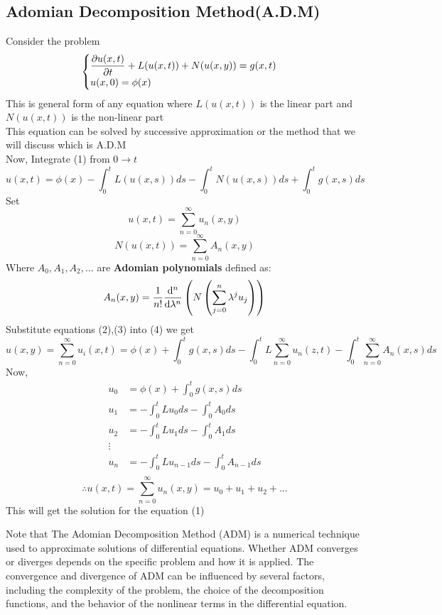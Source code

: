 \subsection {Adomian Decomposition Method(A.D.M)}
Consider the problem
\begin{equation}
    \begin{cases}
        \displaystyle \pdv{u(x,t)}{t} + L(u(x,t)) + N(u(x,y)) = g(x,t)
        \\
        \displaystyle u(x,0) = \phi(x)
    \end{cases}
\end{equation}
This is general form of any equation where $L(u(x,t))$ is the linear part and $N(u(x,t))$ is the non-linear part
\\
This equation can be solved by successive approximation or the method that we will discuss which is A.D.M
\\
Now, Integrate (1) from $0 \to t$
\begin{equation*}
    u(x,t) = \phi(x) - \int_{0}^{t} L(u(x,s))ds  - \int_{0}^{t} N(u(x,s))ds  + \int_{0}^{t} g(x,s)ds
\end{equation*}
Set
\begin{equation}
    u(x,t) = \sum_{n=0}^{\infty} u_n(x,y)
\end{equation}
\begin{equation}
    N(u(x,t)) = \sum_{n=0}^{\infty} A_n(x,y)
\end{equation}
Where $A_0,A_1,A_2,\dots$ are \textbf{Adomian polynomials} defined as:
\begin{equation}
    A_n(x,y) = \frac{1}{n!} \dv[n]{}{\lambda} \left( N \left( \sum_{j=0}^{n}\lambda^j u_j \right) \right)
\end{equation}
Substitute equations (2),(3) into (4) we get
\begin{equation*}
    u(x,y) = \sum_{n=0}^{\infty}u_i(x,t) = \phi(x) + \int_0^t g(x,s) ds - \int_0^t L \sum_{n=0}^{\infty}u_n(z,t) - \int_0^t \sum_{n=0}^{\infty}A_n(x,s) ds
\end{equation*}
Now,
\begin{align*}
    u_0 & = \phi(x) + \int_0^t g(x,s) ds                 \\
    u_1 & = -\int_0^t Lu_0  ds - \int_0^t A_0 ds         \\
    u_2 & = -\int_0^t Lu_1  ds - \int_0^t A_1 ds         \\
    \vdots                                               \\
    u_n & = -\int_0^t Lu_{n-1}  ds - \int_0^t A_{n-1} ds \\
\end{align*}
\[
    \therefore u(x,t) = \sum_{n=0}^{\infty} u_n(x,y) = u_0 + u_1 + u_2 + \dots
\]
This will get the solution for the equation (1)
\par
Note that The Adomian Decomposition Method (ADM)
is a numerical technique used to approximate solutions
of differential equations.
Whether ADM converges or diverges depends on the
specific problem and how it is applied.
The convergence and divergence of ADM can be
influenced by several factors, including the
complexity of the problem, the choice of the
decomposition functions, and the behavior of
the nonlinear terms in the differential equation.

